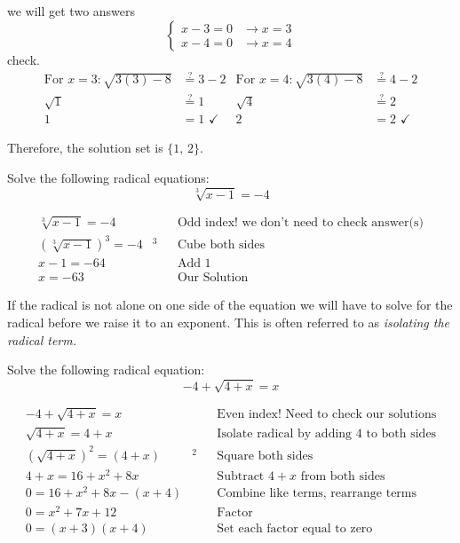 	we will get two answers
	\[ \begin{cases}
		x-3=0  & \rightarrow x=3 \\
		x-4=0  & \rightarrow x=4
	\end{cases} \]
	check.
	\begin{align*}
		\text{For}\,\, x=3:\sqrt{3(3)-8}&\stackrel{?}{=}3-2 & \text{For}\,\, x=4:\sqrt{3(4)-8}&\stackrel{?}{=}4-2\\
		\sqrt{1}&\stackrel{?}{=}1 & \sqrt{4}&\stackrel{?}{=}2\\
		1&=1\,\, \checkmark & 2&=2\,\,\checkmark
	\end{align*}

Therefore, the solution set is $\{1,\,2\}$.
\begin{exa}
Solve the following radical equations:
\[
    \sqrt[3]{x-1}=-4
\]
\end{exa}
	\begin{align*}
		\sqrt[3]{x-1}=-4& & &\text{Odd index! we don't need to check answer(s)}\\
		\left(\sqrt[3]{x-1}\right)^3=-4&^3 & &\text{Cube both sides}\\
		x-1=-64& & &\text{Add 1}\\
		x=-63& & &\text{Our Solution}
	\end{align*}
\begin{nt}
If the radical is not alone on one side of the equation we will have to solve for the
radical before we raise it to an exponent. This is often referred to as \textit{isolating the radical term.}
\end{nt}
\begin{exa}
    Solve the following radical equation:
    \[
        -4+\sqrt{4+x}=x
    \]
\end{exa}
	\begin{align*}
		-4+\sqrt{4+x}=x& & &\text{Even index! Need to check our solutions}\\
		\sqrt{4+x}=4+x& & &\text{Isolate radical by adding $4$ to both sides}\\
		\left(\sqrt{4+x}\right)^2=(4+x)&^2 & &\text{Square both sides}\\
		4+x=16+x^2+8x& & &\text{Subtract $4+x$ from both sides}\\
		0=16+x^2+8x-(x+4)& & &\text{Combine like terms, rearrange terms}\\
		0=x^2+7x+12& & &\text{Factor}\\
		0=(x+3)(x+4)& & &\text{Set each factor equal to zero}
	\end{align*}
